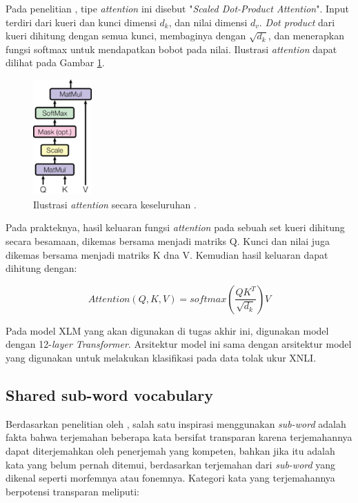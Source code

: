     Pada penelitian \parencite{AttentionVaswani2017}, tipe \textit{attention} ini disebut "\textit{Scaled Dot-Product Attention}". Input terdiri dari kueri dan kunci dimensi \(d_{k}\), dan nilai dimensi \(d_{v}\). \textit{Dot product} dari kueri dihitung dengan semua kunci, membaginya dengan \(\sqrt{d_{k}}\), dan menerapkan fungsi softmax untuk mendapatkan bobot pada nilai. Ilustrasi \textit{attention} dapat dilihat pada Gambar \ref{fig:ilustrasi_attention}.

    \begin{figure}[ht]
        \centering
        \includegraphics[width=0.2\textwidth]{resources/overview-attention.png}
        \caption{Ilustrasi \textit{attention} secara keseluruhan \parencite{AttentionVaswani2017}.}
        \label{fig:ilustrasi_attention}
    \end{figure}

    Pada prakteknya, hasil keluaran fungsi \textit{attention} pada sebuah set kueri dihitung secara besamaan, dikemas bersama menjadi matriks Q. Kunci dan nilai juga dikemas bersama menjadi matriks K dna V. Kemudian hasil keluaran dapat dihitung dengan:

    \begin{equation}
        Attention(Q,K,V) = softmax(\frac{QK^{T}}{\sqrt{d_k}})V
    \end{equation}

    Pada model XLM yang akan digunakan di tugas akhir ini, digunakan model dengan 12-\textit{layer Transformer}. Arsitektur model ini sama dengan arsitektur model yang digunakan \parencite{LampleConneau2019} untuk melakukan klasifikasi pada data tolak ukur XNLI.

    \subsection{Shared sub-word vocabulary}
    Berdasarkan penelitian oleh \parencite{Sennrich_Haddow_Birch_2016}, salah satu inspirasi menggunakan \textit{sub-word} adalah fakta bahwa terjemahan beberapa kata bersifat transparan karena terjemahannya dapat diterjemahkan oleh penerjemah yang kompeten, bahkan jika itu adalah kata yang belum pernah ditemui, berdasarkan terjemahan dari \textit{sub-word} yang dikenal seperti morfemnya atau fonemnya. Kategori kata yang terjemahannya berpotensi transparan meliputi:

